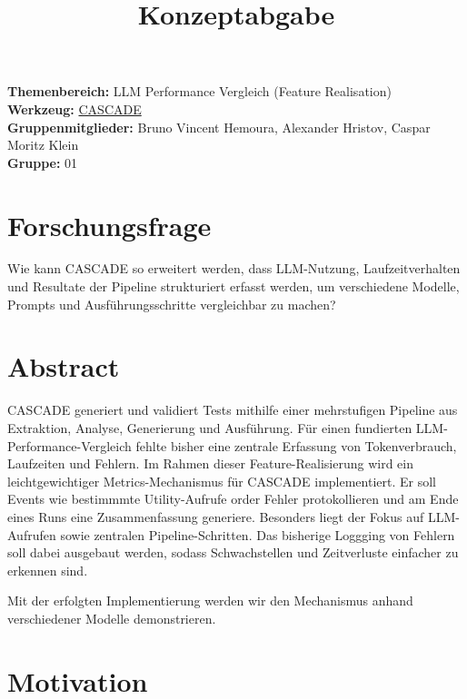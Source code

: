 \documentclass[a4paper,12pt]{article}
\title{Konzeptabgabe}
\date{}
\begin{document}
\maketitle

\noindent\textbf{Themenbereich:} LLM Performance Vergleich (Feature Realisation) \\
\textbf{Werkzeug:} \href{https://github.com/TobiasKiecker/CASCADE}{CASCADE} \\
\textbf{Gruppenmitglieder:} Bruno Vincent Hemoura, Alexander Hristov, Caspar Moritz Klein \\
\textbf{Gruppe:} 01

\section{Forschungsfrage}

Wie kann CASCADE so erweitert werden,
dass LLM-Nutzung, Laufzeitverhalten und Resultate der Pipeline
strukturiert erfasst werden,
um verschiedene Modelle, Prompts und Ausführungsschritte
vergleichbar zu machen?

\section{Abstract}

CASCADE generiert und validiert Tests mithilfe einer mehrstufigen Pipeline
aus Extraktion, Analyse, Generierung und Ausführung.
Für einen fundierten LLM-Performance-Vergleich fehlte bisher
eine zentrale Erfassung von Tokenverbrauch, Laufzeiten und Fehlern.
Im Rahmen dieser Feature-Realisierung wird ein leichtgewichtiger
Metrics-Mechanismus für CASCADE implementiert.
Er soll Events wie bestimmmte Utility-Aufrufe order Fehler protokollieren und
am Ende eines Runs eine Zusammenfassung generiere.
Besonders liegt der Fokus auf LLM-Aufrufen sowie zentralen Pipeline-Schritten.
Das bisherige Loggging von Fehlern soll dabei ausgebaut werden,
sodass Schwachstellen und Zeitverluste einfacher zu erkennen sind.

Mit der erfolgten Implementierung werden wir den Mechanismus
anhand verschiedener Modelle demonstrieren.

\section{Motivation}
\end{document}
